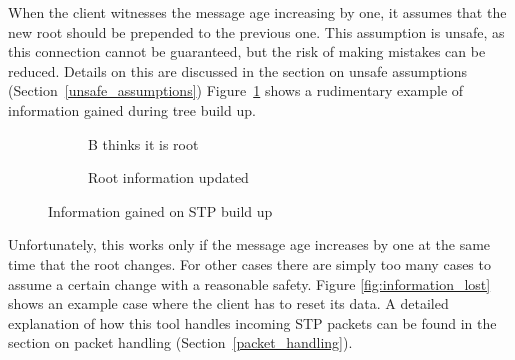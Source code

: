 When the client witnesses the message age increasing by one, it assumes that the new root should be prepended to the previous one.
This assumption is unsafe, as this connection cannot be guaranteed, but the risk of making mistakes can be reduced.
Details on this are discussed in the section on unsafe assumptions (Section~\ref{unsafe_assumptions})
Figure~\ref{fig:build_up} shows a rudimentary example of information gained during tree build up.
\begin{figure}[p]
    \begin{centering}
        \begin{subfigure}[b]{0.4\textwidth}
            \caption{B thinks it is root}
        \end{subfigure}
        \hspace{1cm}
        \begin{subfigure}[b]{0.4\textwidth}
            \centering
            \caption{Root information updated}
        \end{subfigure}
    \end{centering}
    \caption{Information gained on STP build up}
    \label{fig:build_up}
\end{figure}

Unfortunately, this works only if the message age increases by one at the same time that the root changes.
For other cases there are simply too many cases to assume a certain change with a reasonable safety.%
Figure \ref{fig:information_lost} shows an example case where the client has to reset its data.
A detailed explanation of how this tool handles incoming STP packets can be found in the section on packet handling (Section~\ref{packet_handling}).

